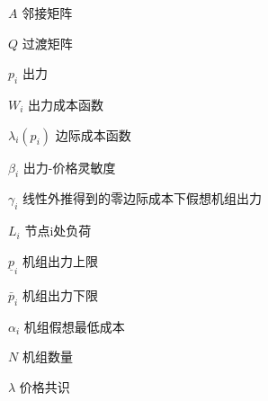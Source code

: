\begin{denotation}[3cm]
    \item[$A$] 邻接矩阵
    \item[$Q$] 过渡矩阵
    \item[$p_{i}$] 出力
    \item[$W_{i}$] 出力成本函数
    \item[$\lambda_{i}\left(p_{i}\right)$] 边际成本函数
    \item[$\beta_{i}$] 出力-价格灵敏度
    \item[$\gamma_{i}$] 线性外推得到的零边际成本下假想机组出力
    \item[$L_{i}$] 节点i处负荷
    \item[$\underline{p}_{i}$] 机组出力上限
    \item[$\bar{p}_{i}$] 机组出力下限
    \item[$\alpha_{i}$] 机组假想最低成本
    \item[$N$] 机组数量
    \item[$\lambda$] 价格共识
\end{denotation}





